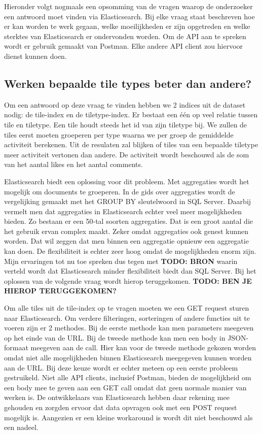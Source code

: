 Hieronder volgt nogmaals een opsomming van de vragen waarop de onderzoeker een antwoord moet vinden via Elasticsearch. Bij elke vraag staat beschreven hoe er kan worden te werk gegaan, welke moeilijkheden er zijn opgetreden en welke sterktes van Elasticsearch er ondervonden worden. Om de API aan te spreken wordt er gebruik gemaakt van Postman. Elke andere API client zou hiervoor dienst kunnen doen.

\subsection{Werken bepaalde tile types beter dan andere?}
Om een antwoord op deze vraag te vinden hebben we 2 indices uit de dataset nodig: de tile-index en de tiletype-index. Er bestaat een één op veel relatie tussen tile en tiletype. Een tile houdt steeds het id van zijn tiletype bij. We zullen de tiles eerst moeten groeperen per type waarna we per groep de gemiddelde activiteit berekenen. Uit de resulaten zal blijken of tiles van een bepaalde tiletype meer activiteit vertonen dan andere. De activiteit wordt beschouwd als de som van het aantal likes en het aantal comments.

Elasticsearch biedt een oplossing voor dit probleem. Met aggregaties wordt het mogelijk om documents te groeperen. In de gids over aggregaties wordt de vergelijking gemaakt met het GROUP BY sleutelwoord in SQL Server. Daarbij vermelt men dat aggregaties in Elasticsearch echter veel meer mogelijkheden bieden. Zo bestaan er een 50-tal soorten aggregaties. Dat is een groot aantal die het gebruik ervan complex maakt. Zeker omdat aggregaties ook genest kunnen worden. Dat wil zeggen dat men binnen een aggregatie opnieuw een aggregatie kan doen. De flexibiliteit is echter zeer hoog omdat de mogelijkheden enorm zijn. Mijn ervaringen tot nu toe spreken dus tegen met \textbf{TODO: BRON} waarin verteld wordt dat Elasticsearch minder flexibiliteit biedt dan SQL Server. Bij het oplossen van de volgende vraag wordt hierop teruggekomen. \textbf{TODO: BEN JE HIEROP TERUGGEKOMEN?}

Om alle tiles uit de tile-index op te vragen moeten we een GET request sturen naar Elasticsearch. Om verdere filteringen, sorteringen of andere functies uit te voeren zijn er 2 methodes. Bij de eerste methode kan men parameters meegeven op het einde van de URL. Bij de tweede methode kan men een body in JSON-formaat meegeven aan de call. Hier kan voor de tweede methode gekozen worden omdat niet alle mogelijkheden binnen Elasticsearch meegegeven kunnen worden aan de URL. Bij deze keuze wordt er echter meteen op een eerste probleem gestruikeld. Niet alle API clients, inclusief Postman, bieden de mogelijkheid om een body mee te geven aan een GET call omdat dat geen normale manier van werken is. De ontwikkelaars van Elasticsearch hebben daar rekening mee gehouden en zorgden ervoor dat data opvragen ook met een POST request mogelijk is. Aangezien er een kleine workaround is wordt dit niet beschouwd als een nadeel.

